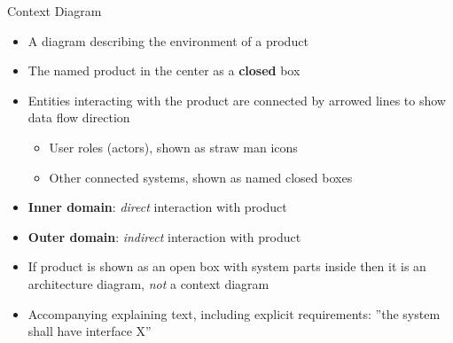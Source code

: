 \begin{Slide}{Context Diagram}

\begin{itemize}
\item A diagram describing the environment of a product
\item The named product in the center as a \textbf{closed} box
\item Entities interacting with the product are connected by arrowed lines to show data flow direction
\begin{itemize}
\item User roles (actors), shown as straw man icons
\item Other connected systems, shown as named closed boxes
\end{itemize}
\item \textbf{Inner domain}: \textit{direct} interaction with product
\item \textbf{Outer domain}: \textit{indirect} interaction with product
\item If product is shown as an open box with system parts inside then it is an architecture diagram, \textit{not} a context diagram
\item Accompanying explaining text, including explicit requirements: ''the system shall have interface X''


\end{itemize}
\end{Slide}